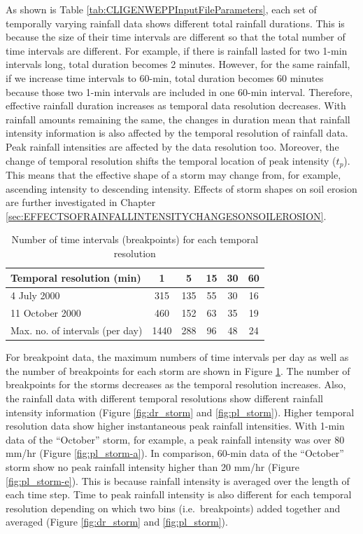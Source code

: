 As shown is Table \ref{tab:CLIGENWEPPInputFileParameters}, each set of
temporally varying rainfall data shows different total rainfall durations. This
is because the size of their time intervals are different so that the total
number of time intervals are different. For example, if there is rainfall
lasted for two 1-min intervals long, total duration becomes 2 minutes. However,
for the same rainfall, if we increase time intervals to 60-min, total duration
becomes 60 minutes because those two 1-min intervals are included in one 60-min
interval. Therefore, effective rainfall duration increases as temporal data
resolution decreases. With rainfall amounts remaining the same, the changes in
duration mean that rainfall intensity information is also affected by the
temporal resolution of rainfall data.
Peak rainfall intensities are affected by the data resolution too. Moreover, the
change of temporal resolution shifts the temporal location of peak intensity
($t_p$). This means that the effective shape of a storm may change from, for
example, ascending intensity to descending intensity. Effects of storm shapes on
soil erosion are further investigated in Chapter
\ref{sec:EFFECTSOFRAINFALLINTENSITYCHANGESONSOILEROSION}.

\begin{table}[htbp]
  \centering
  \small
  \caption{Number of time intervals (breakpoints) for each temporal resolution}
  \label{tab:maxnooftimeintervalsperday}
    \begin{tabular}{lccccc}
    \toprule
    Temporal resolution (min) & 1 & 5 & 15 & 30 & 60 \\ \midrule
    4 July 2000 & 315 & 135 & 55 & 30 & 16 \\
    11 October 2000 & 460 & 152 & 63 & 35 & 19 \\
    Max. no. of intervals (per day) & 1440 & 288 & 96 & 48 & 24 \\
    \bottomrule
    \end{tabular}
\end{table}

For breakpoint data, the maximum numbers of time intervals per day as well as
the number of breakpoints for each storm are shown in Figure
\ref{tab:maxnooftimeintervalsperday}. The number of breakpoints for the storms
decreases as the temporal resolution increases. Also, the rainfall data with
different temporal resolutions show different rainfall intensity information
(Figure \ref{fig:dr_storm} and \ref{fig:pl_storm}). Higher temporal resolution
data show higher instantaneous peak rainfall intensities. With 1-min data of the
``October'' storm, for example, a peak rainfall intensity was over 80 mm/hr
(Figure \ref{fig:pl_storm-a}). In comparison, 60-min data of the ``October''
storm show no peak rainfall intensity higher than 20 mm/hr (Figure
\ref{fig:pl_storm-e}). This is because rainfall intensity is averaged over the
length of each time step. Time to peak rainfall intensity is also different for
each temporal resolution depending on which two bins (i.e.\ breakpoints) added
together and averaged (Figure \ref{fig:dr_storm} and \ref{fig:pl_storm}).

